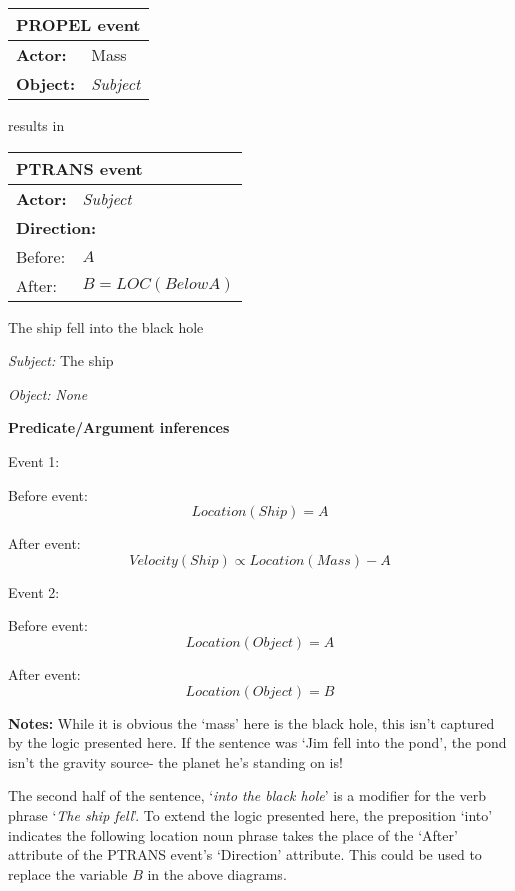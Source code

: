 \documentclass[\mainfile]{subfiles}
\begin{document}
\begin{center}
  \begin{tabular}{l l}
  \toprule
  \multicolumn{2}{l}{\textbf{PROPEL event}}\\
  \hline
  \textbf{Actor:} & Mass\\
  \textbf{Object:} & \textit{Subject}\\
	\bottomrule
  \end{tabular}
  
  \smallskip
  results in
  \smallskip
  
  \begin{tabular}{l l}
    \toprule
    \multicolumn{2}{l}{\textbf{PTRANS event}}\\
    \hline
    \textbf{Actor:} & \textit{Subject}\\
    \multicolumn{2}{l}{\textbf{Direction:}} \\
    Before: & \(A\)\\
    After: & \(B = LOC(Below A)\)\\
    \bottomrule
  \end{tabular}
  
\end{center}

The ship fell into the black hole

\textit{Subject:} The ship

\textit{Object:} \textit{None}
\smallskip

\textbf{Predicate/Argument inferences}

Event 1:

Before event:
\[Location(Ship) = A\]

After event:
\[Velocity(Ship) \propto Location(Mass) - A\]

Event 2:

Before event:
\[Location(Object) = A\]

After event:
\[Location(Object) = B\]
\bigskip

\textbf{Notes:} While it is obvious the `mass' here is the black hole, this isn't captured by the logic presented here. If the sentence was `Jim fell into the pond', the pond isn't the gravity source- the planet he's standing on is!

The second half of the sentence, `\textit{into the black hole}' is a modifier for the verb phrase `\textit{The ship fell}'. To extend the logic presented here, the preposition `into' indicates the following location noun phrase takes the place of the `After' attribute of the PTRANS event's `Direction' attribute. This could be used to replace the variable \(B\) in the above diagrams.
\end{document}
